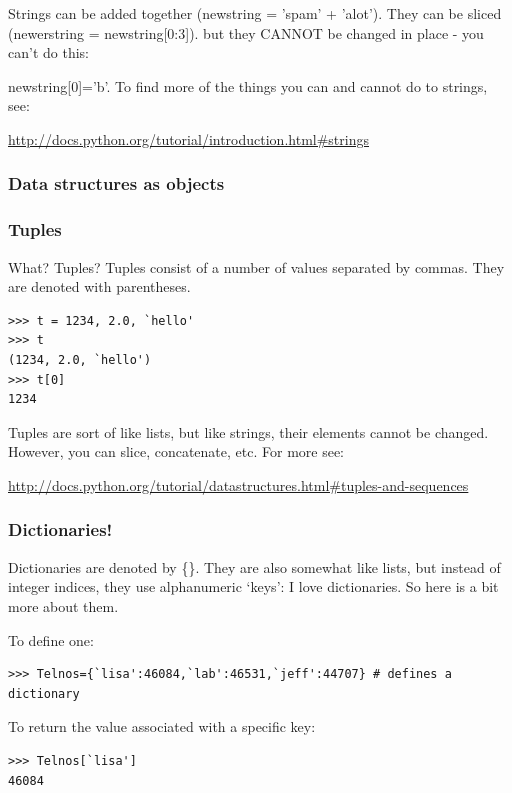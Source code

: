 \documentclass[11pt]{book}
\begin{document}
{{Strings can be added together ({\color{blue}newstring = 'spam' + 'alot'}).  They  can be sliced ({\color{blue}newerstring = newstring[0:3]}). 
but they CANNOT be changed in place - you can't do this: {{\color{blue}newstring[0]='b'}.
To find more of the things you can and cannot do to strings, see: 

\url{http://docs.python.org/tutorial/introduction.html#strings}

\subsubsection{Data structures as objects}



\subsubsection{Tuples}
What?  Tuples?  
Tuples consist of a number of values separated by commas.  They are denoted with parentheses. 
{ \color{blue} \begin{verbatim}
>>> t = 1234, 2.0, `hello'
>>> t
(1234, 2.0, `hello')
>>> t[0]
1234
\end{verbatim}}

\noindent Tuples are sort of like lists, but like strings, their elements cannot be changed.  However, you can slice, concatenate, etc.
 For more see: 
 
\url{ http://docs.python.org/tutorial/datastructures.html#tuples-and-sequences}




\subsubsection {Dictionaries!}

Dictionaries are denoted by \{\}.  They are also somewhat like lists, but instead of integer indices, they use alphanumeric `keys':
I love dictionaries.  So here is a bit more about them.

\noindent
To define one: 
{ \color{blue} \begin{verbatim}
>>> Telnos={`lisa':46084,`lab':46531,`jeff':44707} # defines a dictionary
\end{verbatim}}

\noindent
To return the value associated with a specific key:
{ \color{blue} \begin{verbatim}
>>> Telnos[`lisa']
46084
\end{verbatim}}

}}}
\end{document}
